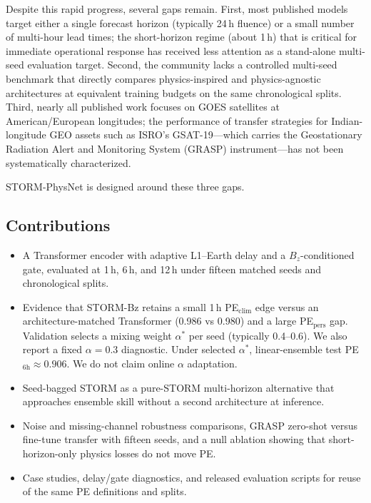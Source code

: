 \documentclass{ieeeaccess}
\begin{document}
Despite this rapid progress, several gaps remain. First, most published models
target either a single forecast horizon (typically 24\,h fluence) or a small
number of multi-hour lead times; the short-horizon regime (about 1\,h) that
is critical for immediate operational response has received less attention as a
stand-alone multi-seed evaluation target. Second, the community lacks a
controlled multi-seed benchmark that directly compares physics-inspired and
physics-agnostic architectures at equivalent training budgets on the same
chronological splits. Third, nearly all published work focuses on GOES satellites
at American/European longitudes; the performance of transfer strategies for
Indian-longitude GEO assets such as ISRO's GSAT-19---which carries the
Geostationary Radiation Alert and Monitoring System (GRASP) instrument---has not
been systematically characterized.

STORM-PhysNet is designed around these three gaps.

\subsection{Contributions}
\begin{itemize}
\item A Transformer encoder with adaptive L1--Earth delay and a
\(B_z\)-conditioned gate, evaluated at 1\,h, 6\,h, and 12\,h under
fifteen matched seeds and chronological splits.
\item Evidence that STORM-Bz retains a small 1\,h PE$_{\mathrm{clim}}$ edge
versus an architecture-matched Transformer (0.986 vs 0.980) and a large
PE$_{\mathrm{pers}}$ gap. Validation selects a mixing weight \(\alpha^*\) per seed (typically 0.4--0.6). We also report a fixed \(\alpha=0.3\) diagnostic. Under selected \(\alpha^*\), linear-ensemble test PE\(_{6\mathrm{h}} \approx 0.906\). We do not claim online \(\alpha\) adaptation.
\item Seed-bagged STORM as a pure-STORM multi-horizon alternative that
approaches ensemble skill without a second architecture at inference.
\item Noise and missing-channel robustness comparisons, GRASP
zero-shot versus fine-tune transfer with fifteen seeds, and a null
ablation showing that short-horizon-only physics losses do not move PE.
\item Case studies, delay/gate diagnostics, and released evaluation
scripts for reuse of the same PE definitions and splits.
\end{itemize}
\end{document}

